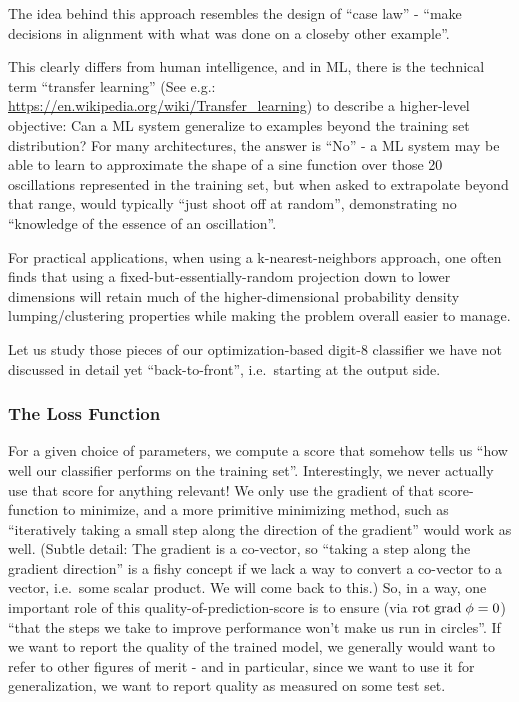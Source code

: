 \documentclass[11pt]{article}
\begin{document}
The idea behind this approach resembles the design of ``case law'' -
``make decisions in alignment with what was done on a closeby other
example''.

This clearly differs from human intelligence, and in ML, there is the
technical term ``transfer learning'' (See e.g.:
\url{https://en.wikipedia.org/wiki/Transfer_learning}) to describe a
higher-level objective: Can a ML system generalize to examples beyond
the training set distribution? For many architectures, the answer is
``No'' - a ML system may be able to learn to approximate the shape of a
sine function over those 20 oscillations represented in the training
set, but when asked to extrapolate beyond that range, would typically
``just shoot off at random'', demonstrating no ``knowledge of the
essence of an oscillation''.

For practical applications, when using a k-nearest-neighbors approach,
one often finds that using a fixed-but-essentially-random projection
down to lower dimensions will retain much of the higher-dimensional
probability density lumping/clustering properties while making the
problem overall easier to manage.

Let us study those pieces of our optimization-based digit-8 classifier
we have not discussed in detail yet ``back-to-front'', i.e.~starting at
the output side.

    \hypertarget{the-loss-function}{%
\subsubsection{The Loss Function}\label{the-loss-function}}

For a given choice of parameters, we compute a score that somehow tells
us ``how well our classifier performs on the training set''.
Interestingly, we never actually use that score for anything relevant!
We only use the gradient of that score-function to minimize, and a more
primitive minimizing method, such as ``iteratively taking a small step
along the direction of the gradient'' would work as well. (Subtle
detail: The gradient is a co-vector, so ``taking a step along the
gradient direction'' is a fishy concept if we lack a way to convert a
co-vector to a vector, i.e.~some scalar product. We will come back to
this.) So, in a way, one important role of this
quality-of-prediction-score is to ensure (via
\({\rm rot}\;{\rm grad}\;\phi=0\)) ``that the steps we take to improve
performance won't make us run in circles''. If we want to report the
quality of the trained model, we generally would want to refer to other
figures of merit - and in particular, since we want to use it for
generalization, we want to report quality as measured on some test set.
\end{document}
